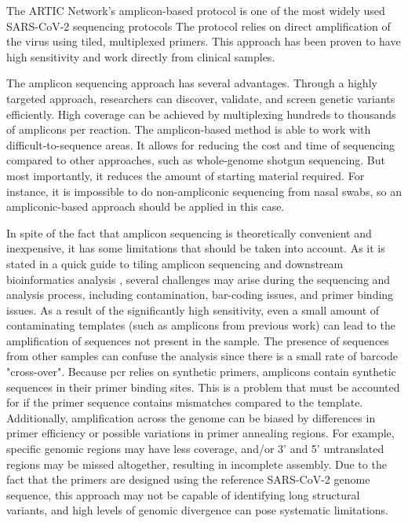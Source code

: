         The ARTIC Network's amplicon-based protocol is one of the most widely used SARS-CoV-2 sequencing protocols \cite{lambisia2022,rd2020,rd2022,quick2020} The protocol relies on direct amplification of the virus using tiled, multiplexed primers. This approach has been proven to have high sensitivity and work directly from clinical samples.
        
        The amplicon sequencing approach has several advantages. Through a highly targeted approach, researchers can discover, validate, and screen genetic variants efficiently. High coverage can be achieved by multiplexing hundreds to thousands of amplicons per reaction. The amplicon-based method is able to work with difficult-to-sequence areas. It allows for reducing the cost and time of sequencing compared to other approaches, such as whole-genome shotgun sequencing. But most importantly, it reduces the amount of starting material required. For instance, it is impossible to do non-ampliconic sequencing from nasal swabs, so an ampliconic-based approach should be applied in this case.
        
        In spite of the fact that amplicon sequencing is theoretically convenient and inexpensive, it has some limitations that should be taken into account. As it is stated in a quick guide to tiling amplicon sequencing and downstream bioinformatics analysis \cite{grubaugh2019,loman}, several challenges may arise during the sequencing and analysis process, including contamination, bar-coding issues, and primer binding issues. As a result of the significantly high sensitivity, even a small amount of contaminating templates (such as amplicons from previous work) can lead to the amplification of sequences not present in the sample. The presence of sequences from other samples can confuse the analysis since there is a small rate of barcode "cross-over". Because \acrshort{pcr} relies on synthetic primers, amplicons contain synthetic sequences in their primer binding sites. This is a problem that must be accounted for if the primer sequence contains mismatches compared to the template. Additionally, amplification across the genome can be biased by differences in primer efficiency or possible variations in primer annealing regions. For example, specific genomic regions \cite{itokawa2020} may have less coverage, and/or 3' and 5' untranslated regions may be missed altogether, resulting in incomplete assembly. Due to the fact that the primers are designed using the reference SARS-CoV-2 genome sequence, this approach may not be capable of identifying long structural variants, and high levels of genomic divergence can pose systematic limitations.
        
